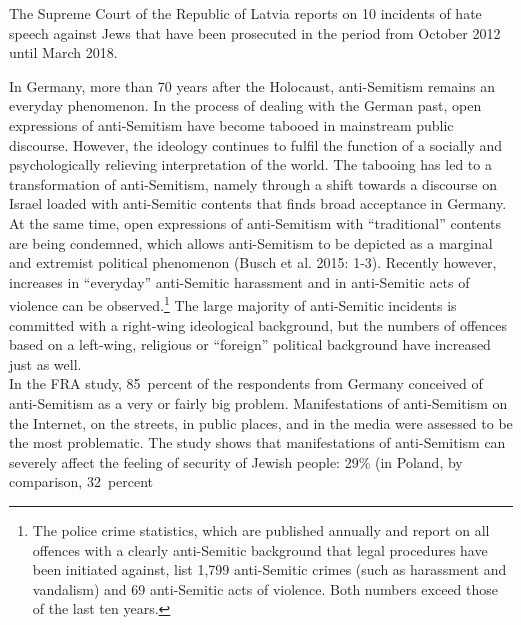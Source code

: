 The Supreme Court of the Republic of Latvia reports on 10 incidents of hate speech against Jews that have been prosecuted in the period from October 2012 until March 2018. \par
In Germany, more than 70 years after the Holocaust, anti-Semitism remains an everyday phenomenon. In the process of dealing with the German past, open expressions of anti-Semitism have become tabooed in mainstream public discourse. However, the ideology continues to fulfil the function of a socially and psychologically relieving interpretation of the world. The tabooing has led to a transformation of anti-Semitism, namely through a shift towards a discourse on Israel loaded with anti-Semitic contents that finds broad acceptance in Germany. At the same time, open expressions of anti-Semitism with ``traditional'' contents are being condemned, which allows anti-Semitism to be depicted as a marginal and extremist political phenomenon (Busch et al. 2015: 1-3). Recently however, increases in ``everyday'' anti-Semitic harassment and in anti-Semitic acts of violence can be observed.\footnote{The police crime statistics, which are published annually and report on all offences with a clearly anti-Semitic background that legal procedures have been initiated against, list 1,799 anti-Semitic crimes (such as harassment and vandalism) and 69 anti-Semitic acts of violence. Both numbers exceed those of the last ten years.} The large majority of anti-Semitic incidents is committed with a right-wing ideological background, but the numbers of offences based on a left-wing, religious or ``foreign'' political background have increased just as well. \\
In the FRA study, 85\ percent of the respondents from Germany conceived of anti-Semitism as a very or fairly big problem. Manifestations of anti-Semitism on the Internet, on the streets, in public places, and in the media were assessed to be the most problematic. The study shows that manifestations of anti-Semitism can severely affect the feeling of security of Jewish people: 29\% (in Poland, by comparison, 32\ percent%
